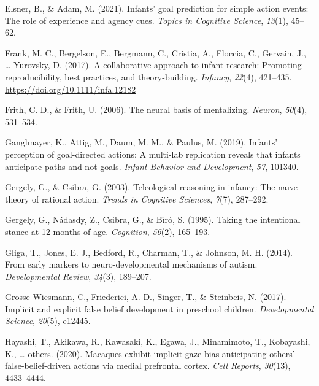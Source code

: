 \documentclass[
  english,
  man,floatsintext]{apa6}
\newlength{\cslhangindent}
\newlength{\cslentryspacingunit} %
\newenvironment{CSLReferences}[2] %
 {%
  \setlength{\parindent}{0pt}
  \ifodd #1
  \let\oldpar\par
  \def\par{\hangindent=\cslhangindent\oldpar}
  \fi
  \setlength{\parskip}{#2\cslentryspacingunit}
 }%
 {}
\begin{document}
\begin{CSLReferences}{1}{0}
\leavevmode{}%
Elsner, B., \& Adam, M. (2021). Infants' goal prediction for simple action events: The role of experience and agency cues. \emph{Topics in Cognitive Science}, \emph{13}(1), 45--62.

\leavevmode{}%
Frank, M. C., Bergelson, E., Bergmann, C., Cristia, A., Floccia, C., Gervain, J., \ldots{} Yurovsky, D. (2017). A collaborative approach to infant research: Promoting reproducibility, best practices, and theory-building. \emph{Infancy}, \emph{22}(4), 421--435. \url{https://doi.org/10.1111/infa.12182}

\leavevmode{}%
Frith, C. D., \& Frith, U. (2006). The neural basis of mentalizing. \emph{Neuron}, \emph{50}(4), 531--534.

\leavevmode{}%
Ganglmayer, K., Attig, M., Daum, M. M., \& Paulus, M. (2019). Infants' perception of goal-directed actions: A multi-lab replication reveals that infants anticipate paths and not goals. \emph{Infant Behavior and Development}, \emph{57}, 101340.

\leavevmode{}%
Gergely, G., \& Csibra, G. (2003). Teleological reasoning in infancy: The na{ı}ve theory of rational action. \emph{Trends in Cognitive Sciences}, \emph{7}(7), 287--292.

\leavevmode{}%
Gergely, G., Nádasdy, Z., Csibra, G., \& Bı́ró, S. (1995). Taking the intentional stance at 12 months of age. \emph{Cognition}, \emph{56}(2), 165--193.

\leavevmode{}%
Gliga, T., Jones, E. J., Bedford, R., Charman, T., \& Johnson, M. H. (2014). From early markers to neuro-developmental mechanisms of autism. \emph{Developmental Review}, \emph{34}(3), 189--207.

\leavevmode{}%
Grosse Wiesmann, C., Friederici, A. D., Singer, T., \& Steinbeis, N. (2017). Implicit and explicit false belief development in preschool children. \emph{Developmental Science}, \emph{20}(5), e12445.

\leavevmode{}%
Hayashi, T., Akikawa, R., Kawasaki, K., Egawa, J., Minamimoto, T., Kobayashi, K., \ldots{} others. (2020). Macaques exhibit implicit gaze bias anticipating others' false-belief-driven actions via medial prefrontal cortex. \emph{Cell Reports}, \emph{30}(13), 4433--4444.


\end{CSLReferences}
\end{document}
